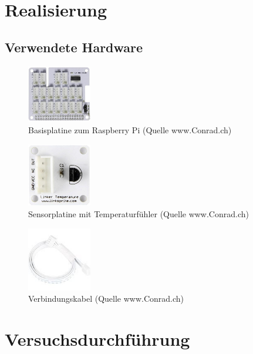 \section{Realisierung}
\subsection{Verwendete Hardware}

\begin{figure}[H]%
\centering
\includegraphics[width=0.25\textwidth]{Images/Basisplatine.jpg}
\caption{Basisplatine zum Raspberry Pi (Quelle www.Conrad.ch)}
\label{fig:plate}
\end{figure}

\begin{figure}[H]%
\centering
\includegraphics[width=0.25\textwidth]{Images/Sensorplatine.jpg}
\caption{Sensorplatine mit Temperaturfühler (Quelle www.Conrad.ch)}
\label{fig:sensor}
\end{figure}

\begin{figure}[H]%
\centering
\includegraphics[width=0.25\textwidth]{Images/Verbindungskabel.jpg}
\caption{Verbindungskabel (Quelle www.Conrad.ch)}
\label{fig:cable}
\end{figure}

\section{Versuchsdurchführung}